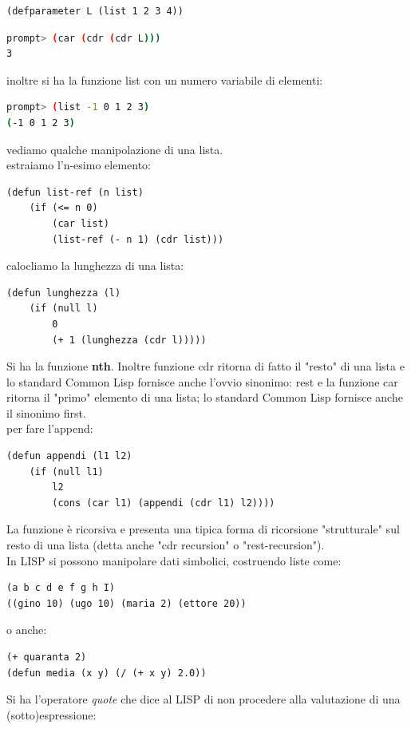 \documentclass[a4paper,12pt, oneside]{book}
\begin{document}
\begin{verbatim}
(defparameter L (list 1 2 3 4))
\end{verbatim}
\begin{shaded}
	\begin{lstlisting}[language=bash]
prompt> (car (cdr (cdr L)))
3
\end{lstlisting}
\end{shaded}
inoltre si ha la funzione list con un numero variabile di elementi:
\begin{shaded}
	\begin{lstlisting}[language=bash]
prompt> (list -1 0 1 2 3)
(-1 0 1 2 3)
\end{lstlisting}
\end{shaded}
vediamo qualche manipolazione di una lista.\\
estraiamo l'n-esimo elemento:
\begin{verbatim}
(defun list-ref (n list)
    (if (<= n 0)
        (car list)
        (list-ref (- n 1) (cdr list)))
\end{verbatim}
calocliamo la lunghezza di una lista:
\begin{verbatim}
(defun lunghezza (l)
    (if (null l)
        0
        (+ 1 (lunghezza (cdr l)))))
\end{verbatim}
Si ha la funzione \textbf{nth}. Inoltre funzione cdr ritorna di fatto il "resto" di una lista e lo standard
Common Lisp fornisce anche l'ovvio sinonimo: rest e la funzione car ritorna il "primo" elemento di una lista; lo standard
Common Lisp fornisce anche il sinonimo first.\\
per fare l'append:
\begin{verbatim}
(defun appendi (l1 l2)
    (if (null l1)
        l2
        (cons (car l1) (appendi (cdr l1) l2))))
\end{verbatim}
La funzione è ricorsiva e presenta una tipica forma di ricorsione "strutturale" sul resto di una lista (detta anche "cdr recursion" o "rest-recursion").\\
In LISP si possono manipolare dati simbolici, costruendo liste come:
\begin{verbatim}
(a b c d e f g h I)
((gino 10) (ugo 10) (maria 2) (ettore 20))
\end{verbatim}
o anche:
\begin{verbatim}
(+ quaranta 2)
(defun media (x y) (/ (+ x y) 2.0))
\end{verbatim}
Si ha l'operatore \textit{quote} che dice al LISP di non procedere alla valutazione di una (sotto)espressione:
\end{document}

